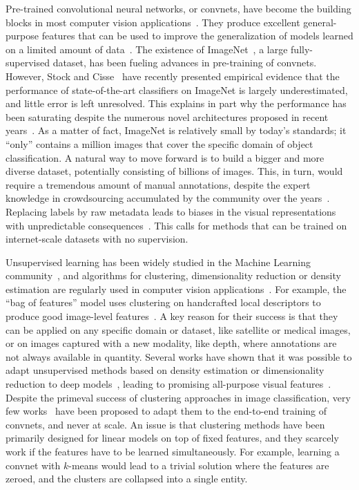 
Pre-trained convolutional neural networks, or convnets, have become the
building blocks in most computer vision
applications~\cite{ren2015faster,chen2016deeplab,weinzaepfel2013deepflow,carreira2016human}.
They produce excellent general-purpose features that can be used to improve the
generalization of models learned on a limited amount of
data~\cite{sharif2014cnn}.  The existence of ImageNet~\cite{deng2009imagenet},
a large fully-supervised dataset, has been fueling advances in pre-training of
convnets.  However, Stock and Cisse~\cite{stock2017convnets} have recently
presented empirical evidence that the performance of state-of-the-art classifiers on
ImageNet is largely underestimated, and little error is left unresolved.  This
explains in part why the performance has been saturating despite the numerous novel
architectures proposed in recent
years~\cite{chen2016deeplab,he2015delving,huang2016densely}.  As a matter of
fact, ImageNet is relatively small by today's standards; it ``only'' contains a
million images that cover the specific domain of object classification.  A
natural way to move forward is to build a bigger and more diverse dataset,
potentially consisting of billions of images.  This, in turn, would require a
tremendous amount of manual annotations, despite the expert knowledge in
crowdsourcing accumulated  by the community over the
years~\cite{kovashka2016crowdsourcing}.  Replacing labels by raw metadata
leads to biases in the visual representations with unpredictable
consequences~\cite{misra2016seeing}.  This calls for methods that can be
trained on internet-scale datasets with no supervision.

Unsupervised learning has been widely studied in the Machine Learning
community~\cite{friedman2001elements}, and algorithms for clustering,
dimensionality reduction or density estimation are regularly used in computer
vision
applications~\cite{turk1991face,shi2000normalized,joulin2010discriminative}.
For example, the ``bag of features'' model uses clustering on handcrafted local
descriptors to produce good image-level features~\cite{csurka2004visual}.  A
key reason for their success is that they can be applied on any specific domain
or dataset, like satellite or medical images, or on images captured with a new
modality, like depth, where annotations are not always available in quantity.
Several works have shown that it was possible to adapt unsupervised methods
based on density estimation or dimensionality reduction to deep
models~\cite{goodfellow2014generative,kingma2013auto}, leading to promising
all-purpose visual
features~\cite{bojanowski2017unsupervised,donahue2016adversarial}.  Despite the
primeval success of clustering approaches in image classification, very few
works~\cite{yang2016joint,xie2016unsupervised} have been proposed to adapt them
to the end-to-end training of convnets, and never at scale.  An issue is that
clustering methods have been primarily designed for linear models on top of
fixed features, and they scarcely work if the features have to be learned
simultaneously.  For example, learning a convnet with $k$-means would lead to a
trivial solution where the features are zeroed, and the clusters are collapsed
into a single entity.

